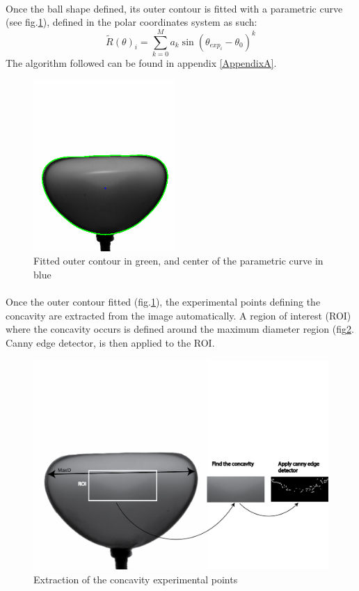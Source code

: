 \paragraph{}
Once the ball shape defined, its outer contour is fitted with a parametric curve (see fig.\ref{fig:outer_contour}), defined in the polar coordinates system as such: 
\begin{equation*}
	\tilde{R}(\theta)_i =\sum\limits_{k=0}^M a_k \sin(\theta_{exp_i}-\theta_0)^k
	\label{eq:parametric_curve}
\end{equation*}
The algorithm followed can be found in appendix \ref{AppendixA}.
\begin{figure}[H] %
	\centering%
  \includegraphics[width=0.48\textwidth]{figures/Chapter_1/outer_contour.png}
	\caption{Fitted outer contour in green, and center of the parametric curve in blue}
	\label{fig:outer_contour}
\end{figure}
\paragraph{}
Once the outer contour fitted (fig.\ref{fig:outer_contour}), the experimental points defining the concavity are extracted from the image automatically. A region of interest (ROI) where the concavity occurs is defined around the maximum diameter region (fig\ref{fig:concavity_extraction}. Canny edge detector, is then applied to the ROI.
\begin{figure}[H] %
	\centering%
  \includegraphics[width=\textwidth]{figures/Chapter_1/concavity_extraction.png}
	\caption{Extraction of the concavity experimental points}
	\label{fig:concavity_extraction}
\end{figure}
